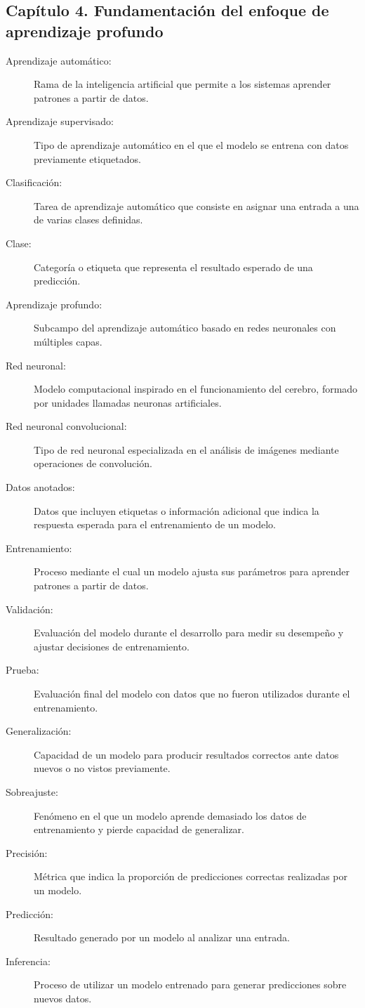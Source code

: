 \subsection*{Capítulo 4. Fundamentación del enfoque de aprendizaje profundo}
\begin{description}
    \item[Aprendizaje automático:] Rama de la inteligencia artificial que permite a los sistemas aprender patrones a partir de datos.
    \item[Aprendizaje supervisado:] Tipo de aprendizaje automático en el que el modelo se entrena con datos previamente etiquetados.
    \item[Clasificación:] Tarea de aprendizaje automático que consiste en asignar una entrada a una de varias clases definidas.
    \item[Clase:] Categoría o etiqueta que representa el resultado esperado de una predicción.
    \item[Aprendizaje profundo:] Subcampo del aprendizaje automático basado en redes neuronales con múltiples capas.
    \item[Red neuronal:] Modelo computacional inspirado en el funcionamiento del cerebro, formado por unidades llamadas neuronas artificiales.
    \item[Red neuronal convolucional:] Tipo de red neuronal especializada en el análisis de imágenes mediante operaciones de convolución.
    \item[Datos anotados:] Datos que incluyen etiquetas o información adicional que indica la respuesta esperada para el entrenamiento de un modelo.
    \item[Entrenamiento:] Proceso mediante el cual un modelo ajusta sus parámetros para aprender patrones a partir de datos.
    \item[Validación:] Evaluación del modelo durante el desarrollo para medir su desempeño y ajustar decisiones de entrenamiento.
    \item[Prueba:] Evaluación final del modelo con datos que no fueron utilizados durante el entrenamiento.
    \item[Generalización:] Capacidad de un modelo para producir resultados correctos ante datos nuevos o no vistos previamente.
    \item[Sobreajuste:] Fenómeno en el que un modelo aprende demasiado los datos de entrenamiento y pierde capacidad de generalizar.
    \item[Precisión:] Métrica que indica la proporción de predicciones correctas realizadas por un modelo.
    \item[Predicción:] Resultado generado por un modelo al analizar una entrada.
    \item[Inferencia:] Proceso de utilizar un modelo entrenado para generar predicciones sobre nuevos datos.
\end{description}
